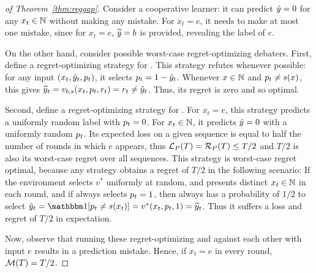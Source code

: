 \documentclass[anon]{alt2027} %
\begin{document}
\begin{proof}[of Theorem~\ref{thm:reggap}]
Consider a cooperative learner: it can predict ${\hat{y}} = 0$ for any $x_t \in \mathbb{N}$ without making any mistake. For $x_t = e$, it needs to make at most one mistake, since for $x_t = e$, ${\widetilde{y}} = b$ is provided, revealing the label of $e$.

On the other hand, consider possible worst-case regret-optimizing debaters. 
First, define a regret-optimizing strategy for \df. This strategy refutes whenever possible: for any input $(x_t,{\hat{y}}_t,{p}_t)$, it selects ${p}_t = 1-{\hat{y}}_t$. Whenever $x \in \mathbb{N}$ and ${p}_t \neq s(x)$, this gives ${\widetilde{y}}_t = v_{b,s}(x_t,{p}_t,{r}_t) = {r}_t \neq {\hat{y}}_t$. Thus, its regret is zero and so optimal. 

Second, define a regret-optimizing strategy for \dt. For $x_t = e$, this strategy predicts a uniformly random label with ${p}_t = 0$. For $x_t \in \mathbb{N}$, it predicts ${\hat{y}} = 0$ with a uniformly random ${p}_t$. Its expected loss on a given sequence is equal to half the number of rounds in which $e$ appears, thus ${{\mathcal L}_P}(T) = {{\mathcal R}_P}(T) \leq T/2$ and $T/2$ is also its worst-case regret over all sequences. This strategy is worst-case regret optimal, because any strategy obtains a regret of $T/2$ in the following scenario: If the environment selects $v^*$ uniformly at random, and presents distinct $x_t \in \mathbb{N}$ in each round, and if \df always selects ${p}_t = 1$, then \df always has a probability of $1/2$ to select $\hy_t = \indct[\ct_t\neq s(x_t)] = v^*(x_t, \ct_t, 1) = \vy_t$. Thus it suffers a loss and regret of $T/2$ in expectation. 

Now, observe that running these regret-optimizing \dt and \df against each other with input $e$ results in a prediction mistake. Hence, if $x_t = e$ in every round, ${\mathcal M}(T) = T/2$. 
\end{proof}
\end{document}

